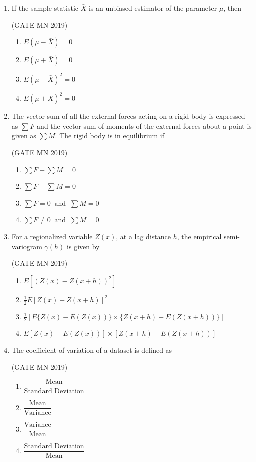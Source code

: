 \documentclass[journal]{IEEEtran}
\begin{document}
\begin{enumerate}
\item If the sample statistic $\bar{X}$ is an unbiased estimator of the parameter $\mu$, then

	\hfill(GATE MN 2019)
\begin{multicols}{2}
\begin{enumerate}
\item $E(\mu - \bar{X}) = 0$
\item $E(\mu + \bar{X}) = 0$
\item $E(\mu - \bar{X})^2 = 0$
\item $E(\mu + \bar{X})^2 = 0$
\end{enumerate}
\end{multicols}

\item The vector sum of all the external forces acting on a rigid body is expressed as $\sum F$ and the vector sum of moments of the external forces about a point is given as $\sum M$. The rigid body is in equilibrium if

	\hfill(GATE MN 2019)
\begin{multicols}{2}
\begin{enumerate}
\item $\sum F - \sum M = 0$
\item $\sum F + \sum M = 0$
\item $\sum F = 0 \;\; \text{and} \;\; \sum M = 0$
\item $\sum F \neq 0 \;\; \text{and} \;\; \sum M = 0$
\end{enumerate}
\end{multicols}


\item For a regionalized variable $Z(x)$, at a lag distance $h$, the empirical semi-variogram $\gamma(h)$ is given by


	\hfill(GATE MN 2019)
\begin{enumerate}
\item $E[(Z(x) - Z(x+h))^2]$
\item $\tfrac{1}{2}E[Z(x) - Z(x+h)]^2$
\item $\tfrac{1}{2}[E\{Z(x) - E(Z(x))\} \times \{Z(x+h) - E(Z(x+h))\}]$
\item $E[Z(x) - E(Z(x))] \times [Z(x+h) - E(Z(x+h))]$
\end{enumerate}



\item The coefficient of variation of a dataset is defined as

	\hfill(GATE MN 2019)
\begin{multicols}{2}
\begin{enumerate}
\item $\dfrac{\text{Mean}}{\text{Standard Deviation}}$
\item $\dfrac{\text{Mean}}{\text{Variance}}$
\item $\dfrac{\text{Variance}}{\text{Mean}}$
\item $\dfrac{\text{Standard Deviation}}{\text{Mean}}$
\end{enumerate}
\end{multicols}



\end{enumerate}
\end{document}

